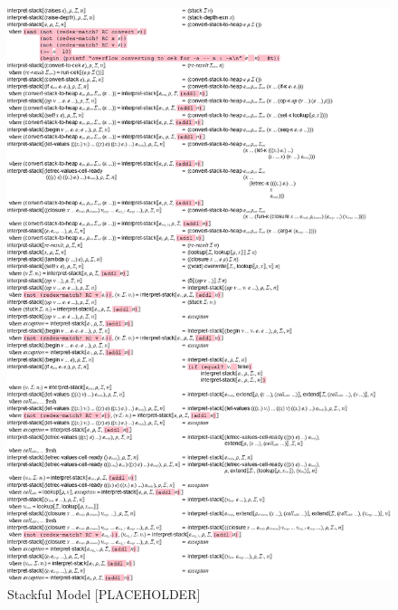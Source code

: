 \begin{appendices}
    \begin{figure}[!h]
        \centering
        \includegraphics[scale=0.4]{sections/figures/interpret-stack-full.png}
        \caption{Stackful Model [PLACEHOLDER]}
        \label{fig:interpret-stack-full}
    \end{figure}


\end{appendices}
